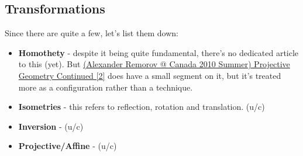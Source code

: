 	\subsection{Transformations}
	Since there are quite a few, let's list them down:
	\begin{itemize}
	\item \textbf{Homothety} - despite it being quite fundamental, there's no dedicated article to this (yet). But \href{run:./F_geometry/(Alexander Remorov @ Canada 2010 Summer) Projective Geometry Continued.pdf}{(Alexander Remorov @ Canada 2010 Summer) Projective Geometry Continued [2]} does have a small segment on it, but it's treated more as a configuration rather than a technique.
	\item \textbf{Isometries} - this refers to reflection, rotation and translation. (u/c) %
	\item \textbf{Inversion} - (u/c)
	\item \textbf{Projective/Affine} - (u/c) 
	\end{itemize}
